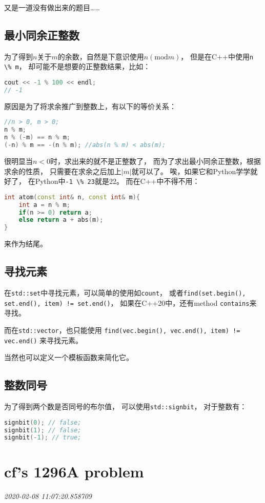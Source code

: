 \documentclass{peterlitsdoc}
\newcommand{\timetx}[1]
    {\par\noindent\emph{\pltgray\small #1}\vspace{2em}}
\newcommand{\vb}{\verb}
\begin{document}
又是一道没有做出来的题目\ldots\ldots

\subsection{最小同余正整数}
为了得到$n$关于$m$的余数，自然是下意识使用$n (\text{mod} m)$，
但是在C++中使用\vb|n \% m|，
却可能不是想要的正整数结果，比如：
\begin{lstlisting}[language=C++]
cout << -1 % 100 << endl;
// -1
\end{lstlisting}

原因是为了将求余推广到整数上，有以下的等价关系：
\begin{lstlisting}[language=C++]
//n > 0, m > 0;
n % m;
n % (-m) == n % m;
(-n) % m == -(n % m); //abs(n % m) < abs(m);
\end{lstlisting}
很明显当$n<0$时，求出来的就不是正整数了，
而为了求出最小同余正整数，根据求余的性质，
只需要在求余之后加上$|m|$就可以了。
唉，如果它和Python学学就好了，
在Python中\vb|-1 \% 23|就是22。
而在C++中不得不用：
\begin{lstlisting}[language=C++]
int atom(const int& n, const int& m){
    int a = n % m;
    if(n >= 0) return a;
    else return a + abs(m);
}
\end{lstlisting}
来作为结尾。

\subsection{寻找元素}
在\vb|std::set|中寻找元素，可以简单的使用如\vb|count|，
或者\vb|find(set.begin(), set.end(), item) != set.end()|，
如果在C++20中，还有method \vb|contains|来寻找。

而在\vb|std::vector|，也只能使用
\vb|find(vec.begin(), vec.end(), item) != vec.end()|
来寻找元素。

当然也可以定义一个模板函数来简化它。

\subsection{整数同号}
为了得到两个数是否同号的布尔值，
可以使用\vb|std::signbit|，
对于整数有：
\begin{lstlisting}[language=C++]
signbit(0); // false;
signbit(1); // false;
signbit(-1); // true;
\end{lstlisting}



\section{cf's 1296A problem}\timetx{2020-02-08 11:07:20.858709}
\end{document}
